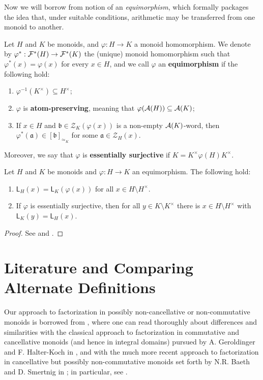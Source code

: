 Now we will borrow from \cite[Definition 3.2]{tringali18} notion of an \textit{equimorphism}, which formally packages the idea that, under suitable conditions, arithmetic may be transferred from one monoid to another.
%
\begin{defn}\label{def:equimorphism}
	Let $H$ and $K$ be monoids, and $\varphi: H\to K$ a monoid homomorphism. We denote by $\varphi^*: \mathcal{F}^*(H)\to\mathcal{F}^*(K)$ the (unique) monoid homomorphism such that $\varphi^\ast(x) = \varphi(x)$ for every $x \in H$, and we call $\varphi$ an \textbf{equimorphism} if the following hold:
	\begin{enumerate}[label={({\small{E}}\arabic{*})}]
		\item\label{def:equimorphism(E1)} $\varphi^{-1}(K^\times)\subseteq H^\times$;
		\item\label{def:equimorphism(E2)} $\varphi$ is \textbf{atom-preserving}, meaning that $\varphi(\mathcal{A}(H)) \subseteq \mathcal{A}(K)$;
		\item\label{def:equimorphism(E3)} If $x\in H$ and $\mathfrak{b}\in \mathcal{Z}_K(\varphi(x))$ is a non-empty $\mathcal{A}(K)$-word, then $\varphi^*(\mathfrak{a}) \in [ \mathfrak{b} ]_{\simeq_K}$ for some $\mathfrak{a}\in \mathcal{Z}_H(x)$.
	\end{enumerate}
	Moreover, we say that $\varphi$ is \textbf{essentially surjective} if $K = K^\times \varphi(H)K^\times$.
\end{defn}
%
\begin{prop}\label{prop:equimorphism}
	Let $H$ and $K$ be monoids and $\varphi:H\to K$ an equimorphism. The following hold:
	\begin{enumerate}[label={\rm (\roman{*})}]
		\item\label{it:prop:equimorphism(i)} $\mathsf{L}_H(x) = \mathsf{L}_K(\varphi(x))$ for all $x\in H\setminus H^\times$.
		\item\label{it:prop:equimorphism(ii)} If $\varphi$ is essentially surjective, then for all $y\in K\setminus K^\times$ there is $x\in H\setminus H^\times$ with $\mathsf{L}_K(y) = \mathsf{L}_H(x)$.
	\end{enumerate}
\end{prop}
%
\begin{proof}
	See \cite[Theorem 2.22(i)]{fan-tringali18} and \cite[Theorem 3.3(i)]{tringali18}.
\end{proof}
%

\section{Literature and Comparing Alternate Definitions} \label{sub:other-factorizations}
%
Our approach to factorization in possibly non-cancellative or non-commutative monoids is borrowed from \cite{fan-tringali18}, where one can read thoroughly about differences and similarities with 
the classical approach to factorization in commutative and cancellative monoids (and hence in integral domains) pursued by A. Geroldinger and F. Halter-Koch in \cite{geroldinger-hk06}, and with the much more recent approach to factorization in cancellative but possibly non-commutative monoids set forth by N.R. Baeth and D. Smertnig in \cite{baeth-smertnig15}; in particular, see \cite[Remarks 2.6 and 2.7]{fan-tringali18}.

